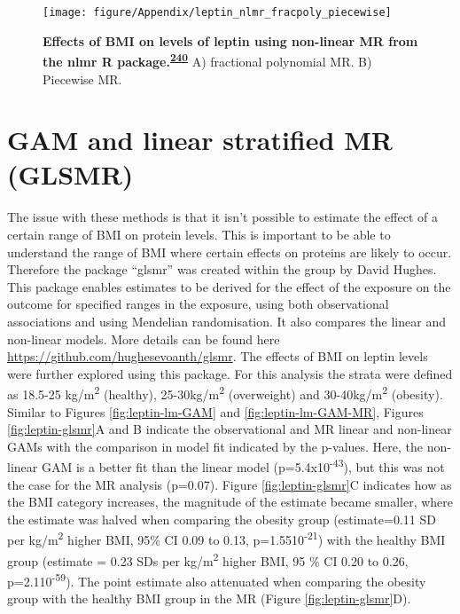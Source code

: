\documentclass[11pt,twoside]{bristolthesis}
\begin{document}
\begin{figure}

{\centering \texttt{[image: figure/Appendix/leptin\_nlmr\_fracpoly\_piecewise]} 

}

\caption[Effects of BMI on levels of leptin using non-linear MR]{\textbf{Effects of BMI on levels of leptin using non-linear MR from the nlmr R package.\textsuperscript{\protect\hyperlink{ref-Staley2017}{240}}} A) fractional polynomial MR. B) Piecewise MR.}\label{fig:leptin-nlmr}
\end{figure}
\hypertarget{gam-and-linear-stratified-mr-glsmr}{%
\section{GAM and linear stratified MR (GLSMR)}\label{gam-and-linear-stratified-mr-glsmr}}

The issue with these methods is that it isn't possible to estimate the effect of a certain range of BMI on protein levels. This is important to be able to understand the range of BMI where certain effects on proteins are likely to occur. Therefore the package ``glsmr'' was created within the group by David Hughes. This package enables estimates to be derived for the effect of the exposure on the outcome for specified ranges in the exposure, using both observational associations and using Mendelian randomisation. It also compares the linear and non-linear models. More details can be found here \url{https://github.com/hughesevoanth/glsmr}. The effects of BMI on leptin levels were further explored using this package. For this analysis the strata were defined as 18.5-25 kg/m\textsuperscript{2} (healthy), 25-30kg/m\textsuperscript{2} (overweight) and 30-40kg/m\textsuperscript{2} (obesity). Similar to Figures \ref{fig:leptin-lm-GAM} and \ref{fig:leptin-lm-GAM-MR}, Figures \ref{fig:leptin-glsmr}A and B indicate the observational and MR linear and non-linear GAMs with the comparison in model fit indicated by the p-values. Here, the non-linear GAM is a better fit than the linear model (p=5.4x10\textsuperscript{-43}), but this was not the case for the MR analysis (p=0.07). Figure \ref{fig:leptin-glsmr}C indicates how as the BMI category increases, the magnitude of the estimate became smaller, where the estimate was halved when comparing the obesity group (estimate=0.11 SD per kg/m\textsuperscript{2} higher BMI, 95\% CI 0.09 to 0.13, p=1.5510\textsuperscript{-21}) with the healthy BMI group (estimate = 0.23 SDs per kg/m\textsuperscript{2} higher BMI, 95 \% CI 0.20 to 0.26, p=2.110\textsuperscript{-59}). The point estimate also attenuated when comparing the obesity group with the healthy BMI group in the MR (Figure \ref{fig:leptin-glsmr}D).
\end{document}
